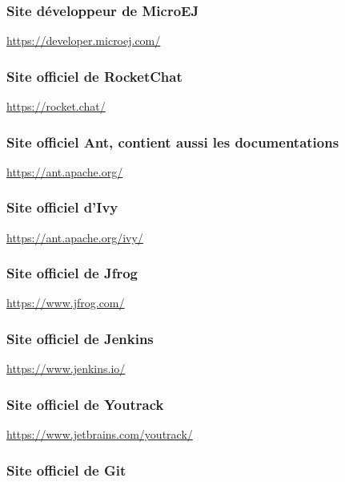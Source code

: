 \documentclass[french,a4paper,12pt]{report}
\begin{document}
\subsubsection{Site développeur de MicroEJ}

\href{https://developer.microej.com/}{https://developer.microej.com/} 

\subsubsection{Site officiel de RocketChat}

\href{https://rocket.chat/}{https://rocket.chat/}

\subsubsection{Site officiel Ant, contient aussi les documentations}

\href{https://ant.apache.org/}{https://ant.apache.org/}

\subsubsection{Site officiel d'Ivy}

\href{https://ant.apache.org/ivy/}{https://ant.apache.org/ivy/}

\subsubsection{Site officiel de Jfrog}

\href{https://www.jfrog.com/}{https://www.jfrog.com/}

\subsubsection{Site officiel de Jenkins}

\href{https://www.jenkins.io/}{https://www.jenkins.io/}

\subsubsection{Site officiel de Youtrack}

\href{https://www.jetbrains.com/youtrack/}{https://www.jetbrains.com/youtrack/}

\subsubsection{Site officiel de Git}
\end{document}
